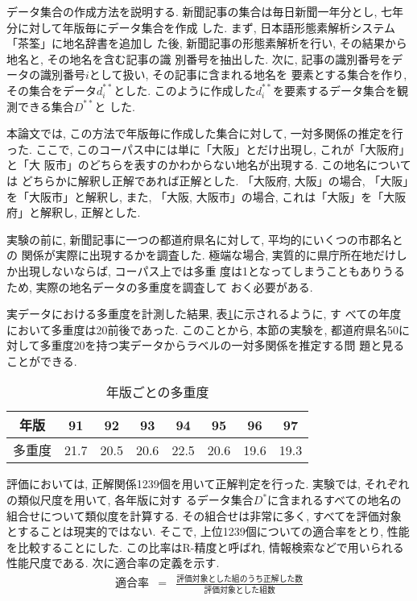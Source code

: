データ集合の作成方法を説明する. 
新聞記事の集合は毎日新聞一年分とし, 七年分に対して年版毎にデータ集合を作成
した\cite{Mainichi91-97}. 
まず, 日本語形態素解析システム「茶筌」\cite{Matsumoto97}に地名辞書を追加し
た後, 新聞記事の形態素解析を行い, その結果から地名と, その地名を含む記事の識
別番号を抽出した.
次に, 記事の識別番号をデータの識別番号$i$として扱い, その記事に含まれる地名を
要素とする集合を作り, その集合をデータ$d^{**}_i$とした.
このように作成した$d^{**}_i$を要素するデータ集合を観測できる集合$D^{**}$と
した. 

本論文では, この方法で年版毎に作成した集合に対して, 一対多関係の推定を行った.
ここで, このコーパス中には単に「大阪」とだけ出現し, これが「大阪府」と「大
阪市」のどちらを表すのかわからない地名が出現する. この地名については
どちらかに解釈し正解であれば正解とした. 「大阪府, 大阪」の場合, 
「大阪」を「大阪市」と解釈し, 
また, 「大阪, 大阪市」の場合, これは「大阪」を「大阪府」と解釈し, 
正解とした. 

実験の前に, 新聞記事に一つの都道府県名に対して, 平均的にいくつの市郡名との
関係が実際に出現するかを調査した. 
極端な場合, 実質的に県庁所在地だけしか出現しないならば, コーパス上では多重
度は1となってしまうこともありうるため, 実際の地名データの多重度を調査して
おく必要がある. 

実データにおける多重度を計測した結果, 表\ref{tab:dupchk}に示されるように, す
べての年度において多重度は20前後であった. 
このことから, 本節の実験を, 
都道府県名50に対して多重度20を持つ実データからラベルの一対多関係を推定する問
題と見ることができる. 

\begin{table}[htb] 
\centering
\caption{年版ごとの多重度}\label{tab:dupchk}
\begin{tabular}{|c||c|c|c|c|c|c|c|} \hline
年版 & 91 & 92 & 93 & 94 & 95 & 96 & 97 \\\hline \hline
多重度 & 21.7 & 20.5 & 20.6 & 22.5 & 20.6 & 19.6 & 19.3 \\\hline
\end{tabular}
\end{table}
評価においては, 正解関係1239個を用いて正解判定を行った. 
実験では, それぞれの類似尺度を用いて, 各年版に対す
るデータ集合$D^*$に含まれるすべての地名の組合せについて類似度を計算する.
その組合せは非常に多く, すべてを評価対象とすることは現実的ではない. 
そこで, 上位1239個についての適合率をとり, 性能を比較することにした. 
この比率はR-精度と呼ばれ, 情報検索などで用いられる性能尺度である. 
次に適合率の定義を示す. 
\begin{eqnarray*}
適合率 &=& \frac{評価対象とした組のうち正解した数}{評価対象とした組数}
\end{eqnarray*}

